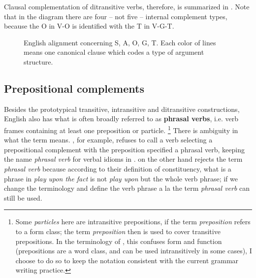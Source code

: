 \documentclass[UTF8, a4paper, oneside, scheme=plain, 12pt]{ctexbook}
\newcommand*{\citepage}[1]{p.~{#1}}
\newcommand*{\concept}[1]{\textbf{#1}}
\newcommand*{\term}[1]{\emph{#1}}
\newcommand{\form}[1]{\emph{#1}}
\begin{document}
Clausal complementation of ditransitive verbs, therefore, is summarized in .
Note that in the diagram there are four -- not five -- internal complement types,
because the O in V-O is identified with the T in V-G-T.

\begin{figure}[H]
    \centering
    
    \caption{English alignment concerning S, A, O, G, T. Each color of lines means one canonical clause which codes a type of argument structure.}
    \label{fig:ditransitive-gt}
\end{figure}


\subsection{Prepositional complements}\label{sec:vp.valence.verb-prep-obj}

Besides the prototypical transitive, intransitive and ditransitive constructions,
English also has what is often broadly referred to as \concept{phrasal verbs}, 
i.e. verb frames containing at least one preposition or particle.%
\footnote{
    Some \term{particles} here are intransitive prepositions, 
    if the term \term{preposition} refers to a form class; 
    the term \term{preposition} then is used to cover transitive prepositions.
    In the terminology of \citet{cgel}, 
    this confuses form and function 
    (prepositions are a word class, 
    and can be used intransitively in some cases),
    I choose to do so to keep the notation consistent with 
    the current grammar writing practice.
}
There is ambiguity in what the term means.
\citet[\citepage{289}]{dixon2005semantic}, for example,
refuses to call a verb selecting a prepositional complement with the preposition specified
a phrasal verb,
keeping the name \term{phrasal verb} for verbal idioms in \citet{cgel}.
\citet{cgel} on the other hand rejects the term \term{phrasal verb} 
because according to their definition of constituency,
what is a phrase in \form{play upon the fact} is not \form{play upon} 
but the whole verb phrase; 
if we change the terminology and define the verb phrase a la 
\citet[\citepage{41}]{dixon2005semantic}
the term \term{phrasal verb} can still be used.
\end{document}
